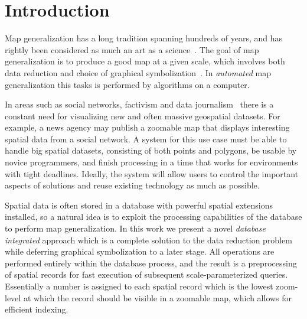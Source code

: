 \section{Introduction}





Map generalization has a long tradition spanning hundreds of years, and has rightly been considered as much an art as a science~\cite{rieger1993consensus}. The goal of map generalization is to produce a good map at a given scale, which involves both data reduction and choice of graphical symbolization~\cite{brassel1988generalization,gruenreich1985cag}.  In \emph{automated} map generalization this tasks is performed by algorithms on a computer.

In areas such as social networks, factivism and data journalism~\cite{cohen2011journalism,bono,sankaranarayanan2009twitterstand} there is a constant need for visualizing new and often massive geospatial datasets. For example, a news agency may publish a zoomable map that displays interesting spatial data from a social network. A system for this use case must be able to handle big spatial datasets, consisting of both points and polygons, be usable by novice programmers, and finish processing in a time that works for environments with tight deadlines. Ideally, the system will allow users to control the important aspects of solutions and reuse existing technology as much as possible.

Spatial data is often stored in a database with powerful spatial extensions installed, so a natural idea is to exploit the processing capabilities of the database to perform map generalization. In this work we present a novel \emph{database integrated} approach which is a complete solution to the data reduction problem while deferring graphical symbolization to a later stage. All operations are performed entirely within the database process, and the result is a preprocessing of spatial records for fast execution of subsequent scale-parameterized queries. Essentially a number is assigned to each spatial record which is the lowest zoom-level at which the record should be visible in a zoomable map, which allows for efficient indexing.

